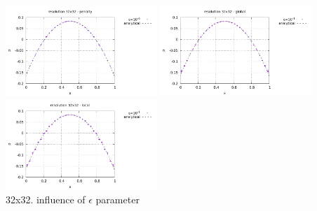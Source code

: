 \begin{center}
\includegraphics[width=5.7cm]{python_codes/fieldstone_115/results/dh/pressure_penalty.pdf}
\includegraphics[width=5.7cm]{python_codes/fieldstone_115/results/dh/pressure_global.pdf}
\includegraphics[width=5.7cm]{python_codes/fieldstone_115/results/dh/pressure_local.pdf}\\
{\captionfont 32x32. influence of $\epsilon$ parameter} 
\end{center}

